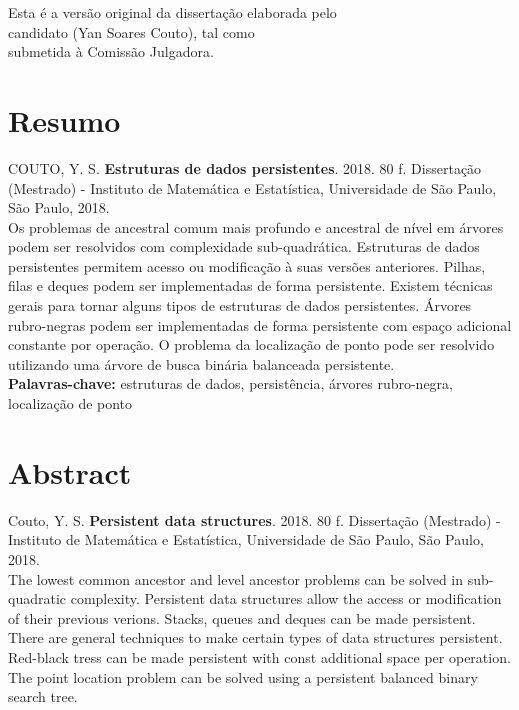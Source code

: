\documentclass[11pt,oneside,a4paper, openany]{book}
\begin{document}
    \vskip 2cm

    \begin{flushright}
    Esta é a versão original da dissertação elaborada pelo\\
    candidato (Yan Soares Couto), tal como \\
    submetida à Comissão Julgadora.
    \end{flushright}

\pagebreak


\chapter*{Resumo}

\noindent COUTO, Y. S. \textbf{Estruturas de dados persistentes}.
2018. 80 f.
Dissertação (Mestrado) - Instituto de Matemática e Estatística,
Universidade de São Paulo, São Paulo, 2018.
\\

Os problemas de ancestral comum mais profundo e ancestral de nível em árvores podem ser resolvidos com complexidade sub-quadrática. Estruturas de dados persistentes permitem acesso ou modificação à suas versões anteriores. Pilhas, filas e deques podem ser implementadas de forma persistente. Existem técnicas gerais para tornar alguns tipos de estruturas de dados persistentes. Árvores rubro-negras podem ser implementadas de forma persistente com espaço adicional constante por operação. O problema da localização de ponto pode ser resolvido utilizando uma árvore de busca binária balanceada persistente.
\\

\noindent \textbf{Palavras-chave:} estruturas de dados, persistência, árvores rubro-negra, localização de ponto

\chapter*{Abstract}
\noindent Couto, Y. S. \textbf{Persistent data structures}. 
2018. 80 f.
Dissertação (Mestrado) - Instituto de Matemática e Estatística,
Universidade de São Paulo, São Paulo, 2018.
\\


The lowest common ancestor and level ancestor problems can be solved in sub-quadratic complexity. Persistent data structures allow the access or modification of their previous verions. Stacks, queues and deques can be made persistent. There are general techniques to make certain types of data structures persistent. Red-black tress can be made persistent with const additional space per operation. The point location problem can be solved using a persistent balanced binary search tree.
\\
\end{document}
